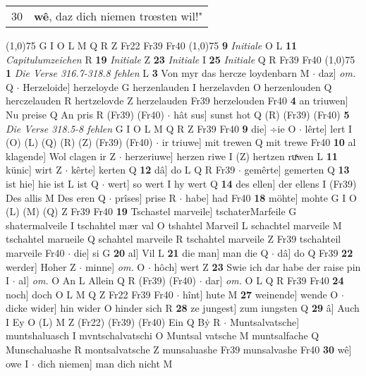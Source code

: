 \documentclass[8pt,a4paper,notitlepage]{article}
\begin{document}
\begin{table}[ht]
\begin{minipage}[t]{0.5\linewidth}
\begin{tabular}{rl}
30 & \textbf{wê}, daz dich niemen trœsten wil!"\\ 
\end{tabular}
\scriptsize
\line(1,0){75} \newline
G I O L M Q R Z Fr22 Fr39 Fr40 \newline
\line(1,0){75} \newline
\textbf{9} \textit{Initiale} O L  \textbf{11} \textit{Capitulumzeichen} R  \textbf{19} \textit{Initiale} Z  \textbf{23} \textit{Initiale} I  \textbf{25} \textit{Initiale} Q R Fr39 Fr40  \newline
\line(1,0){75} \newline
\textbf{1} \textit{Die Verse 316.7-318.8 fehlen} L  \textbf{3} Von myr das hercze loydenbarn M  $\cdot$ daz] \textit{om.} Q  $\cdot$ Herzeloide] herzeloyde G herzenlauden I herzelavden O herzenlouden Q herczelauden R hertzelovde Z herzelauden Fr39 herzelouden Fr40 \textbf{4} an triuwen] Nu preise Q An pris R (Fr39) (Fr40)  $\cdot$ hât sus] sunst hot Q (R) (Fr39) (Fr40) \textbf{5} \textit{Die Verse 318.5-8 fehlen} G I O L M Q R Z Fr39 Fr40  \textbf{9} die] ÷ie O  $\cdot$ lêrte] lert I (O) (L) (Q) (R) (Z) (Fr39) (Fr40)  $\cdot$ ir triuwe] mit trewen Q mit trewe Fr40 \textbf{10} al klagende] Wol clagen ir Z  $\cdot$ herzeriuwe] herzen riwe I (Z) hertzen ruͯwen L \textbf{11} künic] wirt Z  $\cdot$ kêrte] kerten Q \textbf{12} dâ] do L Q R Fr39  $\cdot$ gemêrte] gemerten Q \textbf{13} ist hie] hie ist L ist Q  $\cdot$ wert] so wert I hy wert Q \textbf{14} des ellen] der ellens I (Fr39) Des allis M Des eren Q  $\cdot$ prîses] prise R  $\cdot$ habe] had Fr40 \textbf{18} möhte] mohte G I O (L) (M) (Q) Z Fr39 Fr40 \textbf{19} Tschastel marveile] tschaterMarfeile G shatermalveile I tschahtel mær val O tshahtel Marveil L schachtel marveile M tschahtel marueile Q schahtel marveile R tschahtel marveile Z Fr39 tschahteil marveile Fr40  $\cdot$ die] si G \textbf{20} al] Vil L \textbf{21} die man] man die Q  $\cdot$ dâ] do Q Fr39 \textbf{22} werder] Hoher Z  $\cdot$ minne] \textit{om.} O  $\cdot$ hôch] wert Z \textbf{23} Swie ich dar habe der raise pin I  $\cdot$ al] \textit{om.} O An L Allein Q R (Fr39) (Fr40)  $\cdot$ dar] \textit{om.} O L Q R Fr39 Fr40 \textbf{24} noch] doch O L M Q Z Fr22 Fr39 Fr40  $\cdot$ hînt] hute M \textbf{27} weinende] wende O  $\cdot$ dicke wider] hin wider O hinder sich R \textbf{28} ze jungest] zum iungsten Q \textbf{29} â] Auch I Ey O (L) M Z (Fr22) (Fr39) (Fr40) Ein Q Bẏ R  $\cdot$ Muntsalvatsche] muntshaluasch I mvntschalvatschi O Muntsal vatsche M muntsalfache Q Munschaluashe R montsalvatsche Z munsaluashe Fr39 munsalvashe Fr40 \textbf{30} wê] owe I  $\cdot$ dich niemen] man dich nicht M \newline

\end{minipage}
\end{table}
\end{document}
